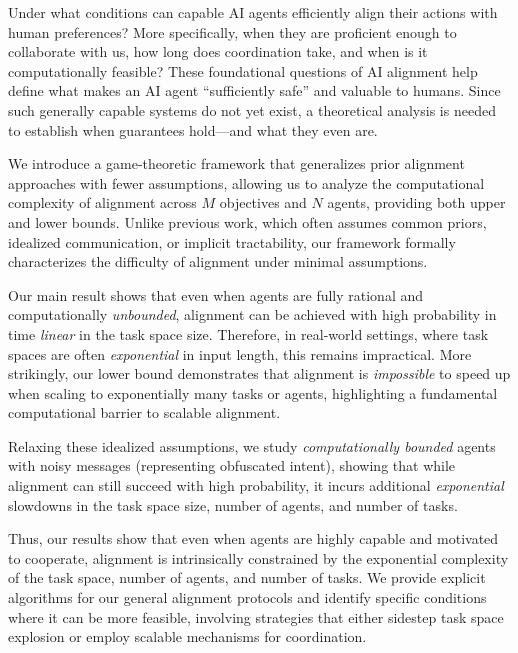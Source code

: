 Under what conditions can capable AI agents efficiently align their actions with human preferences? 
More specifically, when they are proficient enough to collaborate with us, how long does coordination take, and when is it computationally feasible? 
These foundational questions of AI alignment help define what makes an AI agent ``sufficiently safe'' and valuable to humans. 
Since such generally capable systems do not yet exist, a theoretical analysis is needed to establish when guarantees hold---and what they even are.

We introduce a game-theoretic framework that generalizes prior alignment approaches with fewer assumptions, allowing us to analyze the computational complexity of alignment across $M$ objectives and $N$ agents, providing both upper and lower bounds.
Unlike previous work, which often assumes common priors, idealized communication, or implicit tractability, our framework formally characterizes the difficulty of alignment under minimal assumptions.

Our main result shows that even when agents are fully rational and computationally \emph{unbounded}, alignment can be achieved with high probability in time \emph{linear} in the task space size. 
Therefore, in real-world settings, where task spaces are often \emph{exponential} in input length, this remains impractical.
More strikingly, our lower bound demonstrates that alignment is \emph{impossible} to speed up when scaling to exponentially many tasks or agents, highlighting a fundamental computational barrier to scalable alignment.

Relaxing these idealized assumptions, we study \emph{computationally bounded} agents with noisy messages (representing obfuscated intent), showing that while alignment can still succeed with high probability, it incurs additional \emph{exponential} slowdowns in the task space size, number of agents, and number of tasks.

Thus, our results show that even when agents are highly capable and motivated to cooperate, alignment is intrinsically constrained by the exponential complexity of the task space, number of agents, and number of tasks. 
We provide explicit algorithms for our general alignment protocols and identify specific conditions where it can be more feasible, involving strategies that either sidestep task space explosion or employ scalable mechanisms for coordination.
